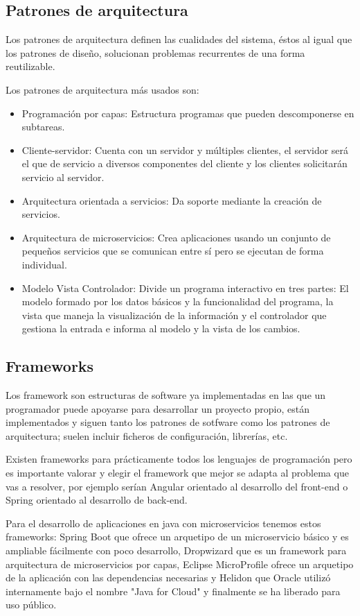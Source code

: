 \documentclass[12pt]{report} %
\begin{document}
	\subsection{Patrones de arquitectura}
	Los patrones de arquitectura definen las cualidades del sistema, éstos al igual que los patrones de diseño, solucionan problemas recurrentes de una forma reutilizable.
	
	Los patrones de arquitectura más usados son:
	\begin{itemize}
		\item Programación por capas: Estructura programas que pueden descomponerse en subtareas. 
		\item Cliente-servidor: Cuenta con un servidor y múltiples clientes, el servidor será el que de servicio a diversos componentes del cliente y los clientes solicitarán servicio al servidor.
		\item Arquitectura orientada a servicios: Da soporte mediante la creación de servicios. 
		\item Arquitectura de microservicios: Crea aplicaciones usando un conjunto de pequeños servicios que se comunican entre sí pero se ejecutan de forma individual.
		\item Modelo Vista Controlador: Divide un programa interactivo en tres partes: El modelo formado por los datos básicos y la funcionalidad del programa, la vista que maneja la visualización de la información y el controlador que gestiona la entrada e informa al modelo y la vista de los cambios.
		
	\end{itemize}
	
	\subsection{Frameworks}
	Los framework son estructuras de software ya implementadas en las que un programador puede apoyarse para desarrollar un proyecto propio, están implementados y siguen tanto los patrones de sotfware como los patrones de arquitectura; suelen incluir ficheros de configuración, librerías, etc.
	
	Existen frameworks para prácticamente todos los lenguajes de programación pero es importante valorar y elegir el framework que mejor se adapta al problema que vas a resolver, por ejemplo serían Angular orientado al desarrollo del front-end o Spring orientado al desarrollo de back-end.
	
	Para el desarrollo de aplicaciones en java con microservicios tenemos estos frameworks: Spring Boot que ofrece un arquetipo de un microservicio básico y es ampliable fácilmente con poco desarrollo,  Dropwizard que es un framework para arquitectura de microservicios por capas, Eclipse MicroProfile ofrece un arquetipo de la aplicación con las dependencias necesarias y Helidon que Oracle utilizó internamente bajo el nombre "Java for Cloud" y finalmente se ha liberado para uso público.
\end{document}
